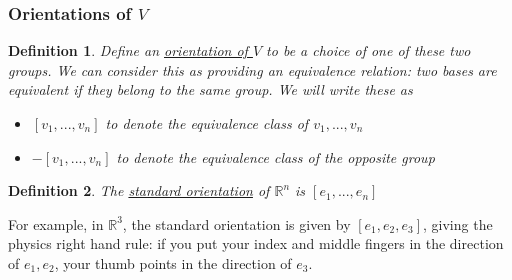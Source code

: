 \documentclass{article}
\newtheorem{definition}{Definition}
\newcommand{\reals}[0]{\mathbb{R}}
\begin{document}
\subsubsection{Orientations of \(V\)}

\begin{definition}
Define an \underline{orientation of \(V\)} to be a choice of one of these two groups.
We can consider this as providing an equivalence relation: two bases are equivalent if they belong to the same group. We will write these as
\begin{itemize}
  \item \([v_1,...,v_n]\) to denote the equivalence class of \(v_1,...,v_n\)
  \item \(-[v_1,...,v_n]\) to denote the equivalence class of the opposite group
\end{itemize}
\end{definition}
\begin{definition}
  The \underline{standard orientation} of \(\reals^n\) is \([e_1,...,e_n]\)
\end{definition}
For example, in \(\reals^3\), the standard orientation is given by \([e_1, e_2, e_3]\), giving the physics right hand rule: if you put your index and middle fingers in the direction of \(e_1, e_2\), your thumb points in the direction of \(e_3\).
\end{document}
